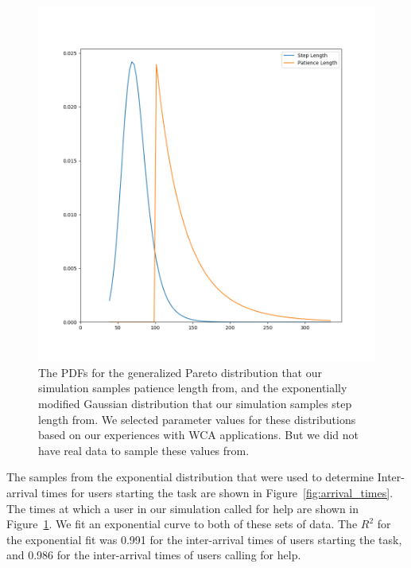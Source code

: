 \begin{figure}[H]
  \includegraphics[width=\textwidth]{figures/montecarlo/step_patience.png}
  \caption{
    The PDFs for the generalized Pareto distribution that our simulation samples
    patience length from, and the exponentially modified Gaussian distribution
    that our simulation samples step length from.
    We selected parameter values for these distributions based on our
    experiences with WCA applications.
    But we did not have real data to sample these values from.
  }\label{fig:step_patience}
\end{figure}

The samples from the exponential distribution that were used to determine
Inter-arrival times for users starting the task are shown in
Figure~\ref{fig:arrival_times}.
The times at which a user in our simulation called for help are shown in
Figure~\ref{fig:step_patience}.
We fit an exponential curve to both of these sets of data.
The $R^2$ for the exponential fit was 0.991 for the inter-arrival times of users
starting the task, and 0.986 for the inter-arrival times of users calling for
help.

